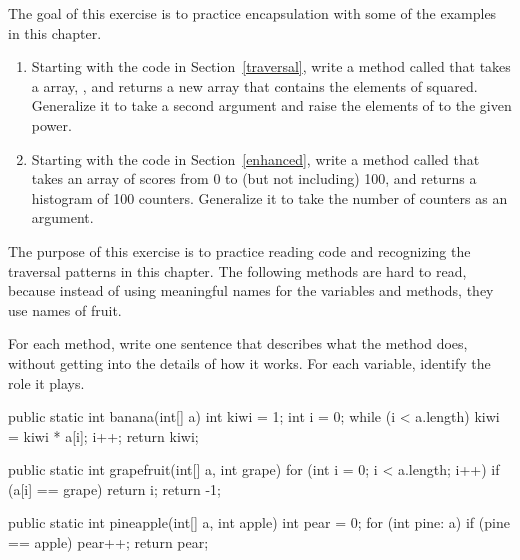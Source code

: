 \begin{exercise}
The goal of this exercise is to practice encapsulation with some of the examples in this chapter.

\begin{enumerate}

\item Starting with the code in Section~\ref{traversal}, write a method called  that takes a  array, , and returns a new array that contains the elements of  squared.
Generalize it to take a second argument and raise the elements of  to the given power.

\item Starting with the code in Section~\ref{enhanced}, write a method called  that takes an  array of scores from 0 to (but not including) 100, and returns a histogram of 100 counters.
Generalize it to take the number of counters as an argument.

\end{enumerate}

\end{exercise}


\begin{exercise}
The purpose of this exercise is to practice reading code and recognizing the traversal patterns in this chapter.
The following methods are hard to read, because instead of using meaningful names for the variables and methods, they use names of fruit.

For each method, write one sentence that describes what the method does, without getting into the details of how it works.
For each variable, identify the role it plays.

\begin{code}
public static int banana(int[] a) {
    int kiwi = 1;
    int i = 0;
    while (i < a.length) {
        kiwi = kiwi * a[i];
        i++;
    }
    return kiwi;
}
\end{code}

\begin{code}
public static int grapefruit(int[] a, int grape) {
    for (int i = 0; i < a.length; i++) {
        if (a[i] == grape) {
            return i;
        }
    }
    return -1;
}
\end{code}

\begin{code}
public static int pineapple(int[] a, int apple) {
    int pear = 0;
    for (int pine: a) {
        if (pine == apple) {
            pear++;
        }
    }
    return pear;
}
\end{code}

\end{exercise}


